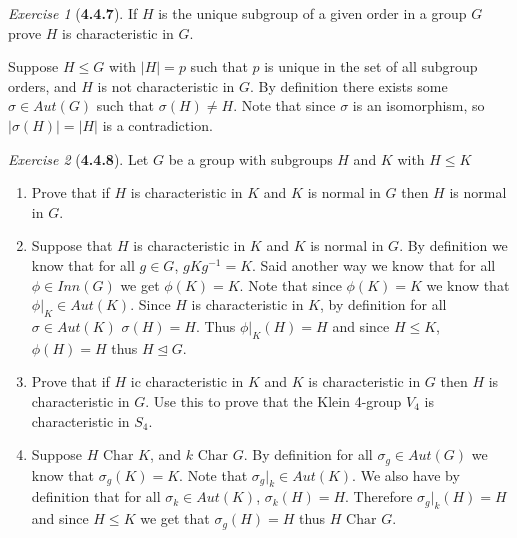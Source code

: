 \documentclass[12pt]{amsart}
\makeatletter
\theoremstyle{remark}
\newtheorem*{exercise}{Exercise}%
\renewenvironment{proof}[1][\proofname]{\par\doublespacing
  \pushQED{\qed}%
  \normalfont \topsep6\p@\@plus6\p@\relax
  \list{}{%
    \settowidth{\leftmargin}{\itshape\proofname:\hskip\labelsep}%
    \setlength{\labelwidth}{0pt}%
    \setlength{\itemindent}{-\leftmargin}%
  }%
  \item[\hskip\labelsep\itshape#1\@addpunct{:}]\ignorespaces
}{%
  \popQED\endlist\@endpefalse
  \singlespacing
}
\theoremstyle{mycomment}
\makeatother
\begin{document}
\begin{exercise}[\textbf{4.4.7}] If $H$ is the unique subgroup of a given order in a group $G$ prove $H$ is characteristic in $G$.  
  \begin{proof} Suppose $H \leq G$ with $|H| = p$ such that $p$ is unique in the set of all subgroup orders, and $H$ is not characteristic in $G$.
    By definition there exists some $\sigma \in Aut(G)$ such that $\sigma(H) \neq H$. Note that since $\sigma$ is an isomorphism, so $|\sigma(H)| = |H|$ is a contradiction.  
  \end{proof}
\end{exercise}
\vspace{.15in}


\begin{exercise}[\textbf{4.4.8}] Let $G$ be a group with subgroups $H$ and $K$ with $H \leq K$
  \begin{enumerate}
    \item[a.] Prove that if $H$ is characteristic in $K$ and $K$ is normal in $G$ then $H$ is normal in $G$.\\
    \begin{proof} Suppose that $H$ is characteristic in $K$ and $K$ is normal in $G$. By definition we know that for 
      all $g \in G$, $gKg^{-1} = K$. Said another way we know that for all $\phi \in Inn(G)$ we get $\phi(K) = K$. Note 
      that since $\phi(K) = K$ we know that $\phi|_K \in Aut(K)$. Since $H$ is characteristic in $K$, by definition for all $\sigma \in Aut(K)$
      $\sigma(H) = H$. Thus $\phi|_K(H) = H$ and since $H \leq K$, $\phi(H) = H$ thus $H \trianglelefteq G$. 
      
    \end{proof}
    \item[b.] Prove that if $H$ ic characteristic in $K$ and $K$ is characteristic in $G$ then $H$ is characteristic in $G$. Use this to prove 
    that the Klein 4-group $V_4$ is characteristic in $S_4$.
    \begin{proof}
      Suppose $H \text{ Char } K$, and $k \text{ Char } G$. By definition  for all $\sigma_g \in Aut(G)$ we know that 
      $\sigma_g(K) = K$. Note that $\sigma_g|_k \in Aut(K)$. We also have by definition that for all $\sigma_k \in Aut(K)$, $\sigma_k(H) = H$. 
      Therefore $\sigma_g|_k(H) = H$ and since $H \leq K$ we get that $\sigma_g(H) = H$ thus $H \text{ Char } G$.
      


\end{proof}
\end{enumerate}
\end{exercise}
\end{document}

